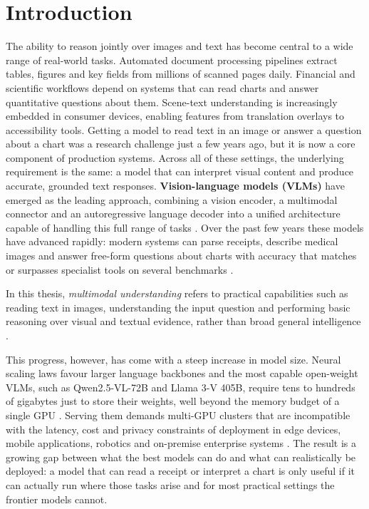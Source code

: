 \chapter{Introduction}
\label{chap:introduction}

The ability to reason jointly over images and text has become central to a
wide range of real-world tasks. Automated document processing pipelines
extract tables, figures and key fields from millions of scanned pages daily.
Financial and scientific workflows depend on systems that can read charts and
answer quantitative questions about them. Scene-text understanding is
increasingly embedded in consumer devices, enabling features from translation
overlays to accessibility tools. Getting a model to read text in an image or
answer a question about a chart was a research challenge just a few years ago,
but it is now a core component of production systems. Across all
of these settings, the underlying requirement is the same: a model that can
interpret visual content and produce accurate, grounded text responses.
\textbf{Vision-language models (VLMs)} have emerged as the leading approach,
combining a vision encoder, a multimodal connector and an autoregressive
language decoder into a unified architecture capable of handling this full
range of tasks
\cite{alayrac2022flamingovisuallanguagemodel,li2023blip2bootstrappinglanguageimagepretraining,liu2023visualinstructiontuning,singh2019vqamodelsread,mathew2021docvqadatasetvqadocument,masry2022chartqabenchmarkquestionanswering}.
Over the past few years these models have advanced rapidly: modern systems
can parse receipts, describe medical images and answer free-form questions
about charts with accuracy that matches or surpasses specialist tools on
several benchmarks \cite{bai2025qwen25vl,wang2024qwen2vl,chen2024internvl25}.

In this thesis, \textit{multimodal understanding} refers to practical
capabilities such as reading text in images, understanding the input question
and performing basic reasoning over visual and textual evidence, rather than
broad general intelligence
\cite{singh2019vqamodelsread,mathew2021docvqadatasetvqadocument,masry2022chartqabenchmarkquestionanswering}.

This progress, however, has come with a steep increase in model size. Neural
scaling laws favour larger language backbones and the most capable
open-weight VLMs, such as Qwen2.5-VL-72B and Llama 3-V 405B, require tens
to hundreds of gigabytes just to store their weights, well beyond the memory
budget of a single GPU
\cite{kaplan2020scalinglaws,hoffmann2022trainingcomputeoptimal,bai2025qwen25vl,grattafiori2024llama3}.
Serving them demands multi-GPU clusters that are incompatible with the
latency, cost and privacy constraints of deployment in edge devices, mobile
applications, robotics and on-premise enterprise systems
\cite{driess2023palme,brohan2023rt2}. The result is a growing gap between
what the best models can do and what can realistically be deployed: a model
that can read a receipt or interpret a chart is only useful if it can
actually run where those tasks arise and for most practical settings the
frontier models cannot.

